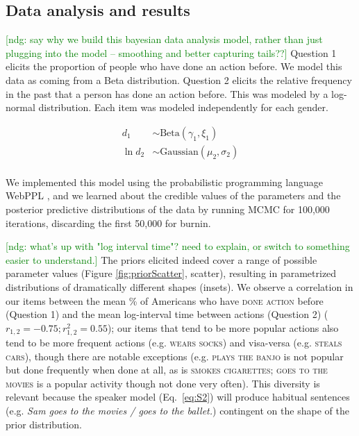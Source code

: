 \documentclass[10pt,letterpaper]{article}
\newcommand{\ndg}[1]{\textcolor{Green}{[ndg: #1]}}
\begin{document}
\subsection{Data analysis and results}

\ndg{say why we build this bayesian data analysis model, rather than just plugging into the model -- smoothing and better capturing tails??}
Question 1 elicits the proportion of people who have done an action before. 
We model this data as coming from a Beta distribution. 
Question 2 elicits the relative frequency in the past that a person has done an action before.
This was modeled by a log-normal distribution. 
Each item was modeled independently for each gender.
%
\begin{minipage}{0.5 \textwidth} \small
\begin{align*}
d_{1} &\sim \text{Beta}(\gamma_{1}, \xi_{1}) \\
\ln d_{2} &\sim \text{Gaussian}(\mu_{2}, \sigma_{2}) \\
\end{align*}
\end{minipage}
%
We implemented this model using the probabilistic programming language WebPPL \cite{dippl}, and we learned about the credible values of the parameters and the posterior predictive distributions of the data by running MCMC for 100,000 iterations, discarding the first 50,000 for burnin.
%

\ndg{what's up with "log interval time"? need to explain, or switch to something easier to understand.}
The priors elicited indeed cover a range of possible parameter values (Figure \ref{fig:priorScatter}, scatter), resulting in parametrized distributions of dramatically different shapes (insets).  
We observe a correlation in our items between the mean \% of Americans who have \textsc{done action} before (Question 1) and the mean log-interval time between actions (Question 2) ($r_{1,2} = -0.75; r^2_{1,2} = 0.55$); our items that tend to be more popular actions also tend to be more frequent actions (e.g. \textsc{wears socks}) and visa-versa (e.g. \textsc{steals cars}), though there are notable exceptions (e.g. \textsc{plays the banjo} is not popular but done frequently when done at all, as is \textsc{smokes cigarettes}; \textsc{goes to the movies} is a popular activity though not done very often). 
This diversity is relevant because the speaker model (Eq.~\ref{eq:S2}) will produce habitual sentences (e.g. \emph{Sam goes to the movies / goes to the ballet.}) contingent on the shape of the prior distribution. 
\end{document}

